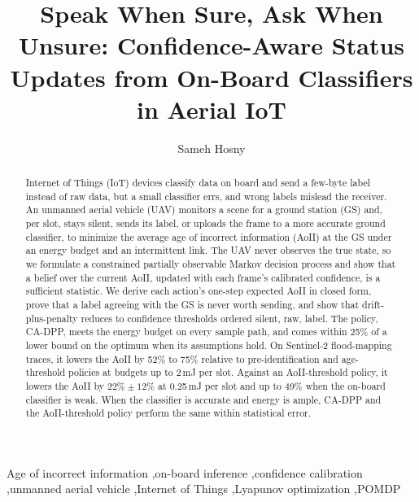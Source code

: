 \documentclass[5p,twocolumn]{elsarticle}
\theoremstyle{remark}
\begin{document}
\begin{frontmatter}

\title{Speak When Sure, Ask When Unsure: Confidence-Aware Status Updates from On-Board Classifiers in Aerial IoT}

\author{Sameh Hosny}

\begin{abstract}
Internet of Things (IoT) devices classify data on board and send a few-byte label instead of raw data, but a small classifier errs, and wrong labels mislead the receiver. An unmanned aerial vehicle (UAV) monitors a scene for a ground station (GS) and, per slot, stays silent, sends its label, or uploads the frame to a more accurate ground classifier, to minimize the average age of incorrect information (AoII) at the GS under an energy budget and an intermittent link. The UAV never observes the true state, so we formulate a constrained partially observable Markov decision process and show that a belief over the current AoII, updated with each frame's calibrated confidence, is a sufficient statistic. We derive each action's one-step expected AoII in closed form, prove that a label agreeing with the GS is never worth sending, and show that drift-plus-penalty reduces to confidence thresholds ordered silent, raw, label. The policy, CA-DPP, meets the energy budget on every sample path, and comes within 25\% of a lower bound on the optimum when its assumptions hold. On Sentinel-2 flood-mapping traces, it lowers the AoII by 52\% to 75\% relative to pre-identification and age-threshold policies at budgets up to 2\,mJ per slot. Against an AoII-threshold policy, it lowers the AoII by $22\%\pm12\%$ at 0.25\,mJ per slot and up to 49\% when the on-board classifier is weak. When the classifier is accurate and energy is ample, CA-DPP and the AoII-threshold policy perform the same within statistical error.
\end{abstract}

\begin{keyword}
Age of incorrect information \sep on-board inference \sep confidence calibration \sep unmanned aerial vehicle \sep Internet of Things \sep Lyapunov optimization \sep POMDP
\end{keyword}

\end{frontmatter}

\end{document}
